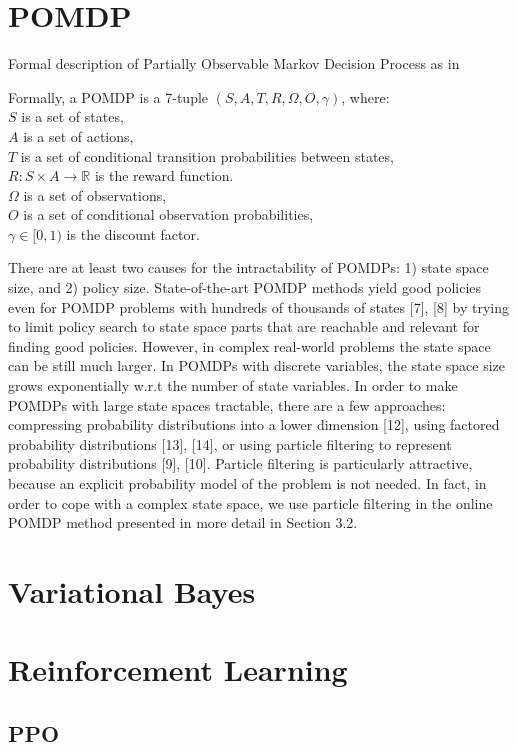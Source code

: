 \documentclass[12pt,a4paper]{article}
\begin{document}
\section{POMDP}
Formal description of Partially Observable Markov Decision Process as in \cite{Spaan2012}

Formally, a POMDP is a 7-tuple $(S,A,T,R,\Omega,O,\gamma)$, where: \\
$S$ is a set of states, \\
$A$ is a set of actions, \\
$T$ is a set of conditional transition probabilities between states, \\
$R: S\times A \rightarrow \mathbb{R}$  is the reward function. \\
$\Omega$ is a set of observations, \\
$O$ is a set of conditional observation probabilities, \\
$\gamma \in [0,1)$ is the discount factor.


There are at least two causes for the intractability of POMDPs: 1) state space size, and 2) policy size. State-of-the-art POMDP
 methods yield good policies even for POMDP problems with hundreds of thousands of states [7], [8] by trying to limit policy 
 search to state space parts that are reachable and relevant for finding good policies. However, in complex real-world problems
  the state space can be still much larger. In POMDPs with discrete variables, the state space size grows exponentially w.r.t 
  the number of state variables. In order to make POMDPs with large state spaces tractable, there are a few approaches: compressing 
  probability distributions into a lower dimension [12], using factored probability distributions [13], [14], or using particle filtering
   to represent probability distributions [9], [10]. Particle filtering is particularly attractive, because an explicit probability model
    of the problem is not needed. In fact, in order to cope with a complex state space, we use particle filtering in the online POMDP method presented in more detail in Section 3.2.
\section{Variational Bayes}
\section{Reinforcement Learning}
\subsection{PPO}
\end{document}
